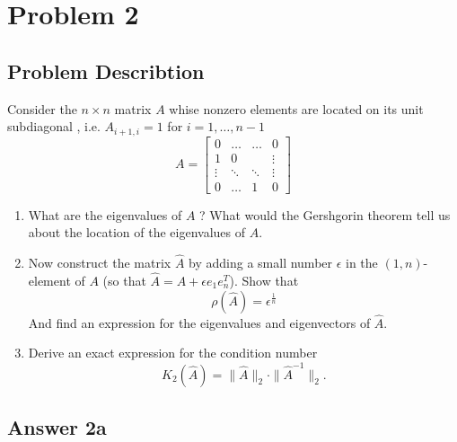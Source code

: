 \documentclass{article}
\theoremstyle{remark}
\begin{document}
\newpage

\section{Problem 2}%
\label{sec:problem_2}

\subsection{Problem Describtion}%
\label{sub:problem_describtion}



Consider the $n \times n $ matrix $A$ whise nonzero elements are located on its unit subdiagonal , i.e. $A_{i+1, i} = 1$ for $i = 1, \ldots, n-1$\[
A = \begin{bmatrix} 
  0  &  \ldots  &  \ldots  & 0 \\
  1  &  0  &    & \vdots  \\
  \vdots   & \ddots   & \ddots   &  \vdots   \\
  0  &  \ldots     & 1  & 0 
\end{bmatrix} 
\] 

\begin{enumerate}[label=(\alph*)]
  \item  What are the eigenvalues of $A$ ? What would the Gershgorin theorem tell us about the location of the eigenvalues of $A$.
  \item  Now construct the matrix $\hat{A}$ by adding a small number $\epsilon $ in the $\left( 1, n \right)$- element of $A$ (so that $\hat{A} = A  +  \epsilon e_{1} e_{n}^{T} $). Show that \[
      \rho \left( \hat{A} \right) = \epsilon ^{\frac{1}{n} }
  \] 
  And find an expression for the eigenvalues and eigenvectors of $\hat{A}$. 
\item Derive an exact expression for the condition number \[
K_{2} \left( \hat{A} \right) =  \|\hat{A}\|_{2}^{} \cdot  \|\hat{A}^{-1}\|_{2}^{}.  
\] 

  \end{enumerate}

  \subsection{Answer 2a}%
  \label{sub:answer_a}
  
\end{document}
